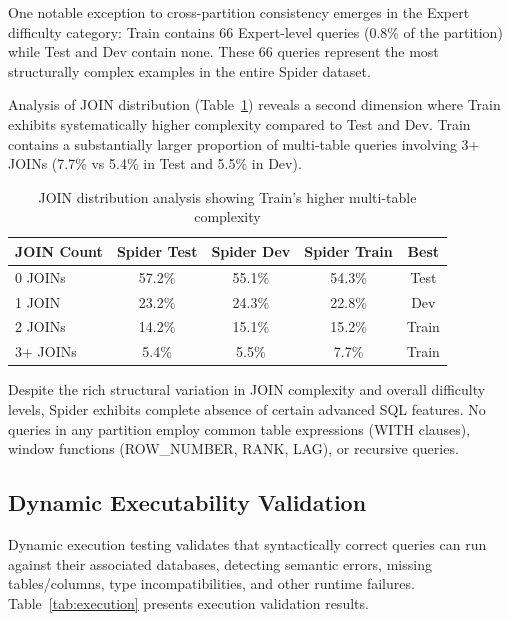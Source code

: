 \documentclass[]{einformatica}
\begin{document}
One notable exception to cross-partition consistency emerges in the Expert difficulty category: Train contains 66 Expert-level queries (0.8\% of the partition) while Test and Dev contain none. These 66 queries represent the most structurally complex examples in the entire Spider dataset.

Analysis of JOIN distribution (Table~\ref{tab:joins}) reveals a second dimension where Train exhibits systematically higher complexity compared to Test and Dev. Train contains a substantially larger proportion of multi-table queries involving 3+ JOINs (7.7\% vs 5.4\% in Test and 5.5\% in Dev).

\begin{table}[ht]
    \caption{JOIN distribution analysis showing Train's higher multi-table complexity}
    \label{tab:joins}
    \centering
    \footnotesize
    \begin{tabular}{lcccc}
        \toprule
        \textbf{JOIN Count} & \textbf{Spider Test} & \textbf{Spider Dev} & \textbf{Spider Train} & \textbf{Best} \\
        \midrule
        0 JOINs & 57.2\% & 55.1\% & 54.3\% & Test \\
        1 JOIN & 23.2\% & 24.3\% & 22.8\% & Dev \\
        2 JOINs & 14.2\% & 15.1\% & 15.2\% & Train \\
        3+ JOINs & 5.4\% & 5.5\% & 7.7\% & Train \\
        \bottomrule
    \end{tabular}
\end{table}

Despite the rich structural variation in JOIN complexity and overall difficulty levels, Spider exhibits complete absence of certain advanced SQL features. No queries in any partition employ common table expressions (WITH clauses), window functions (ROW\_NUMBER, RANK, LAG), or recursive queries.

\subsection{Dynamic Executability Validation}

Dynamic execution testing validates that syntactically correct queries can run against their associated databases, detecting semantic errors, missing tables/columns, type incompatibilities, and other runtime failures. Table~\ref{tab:execution} presents execution validation results.
\end{document}
